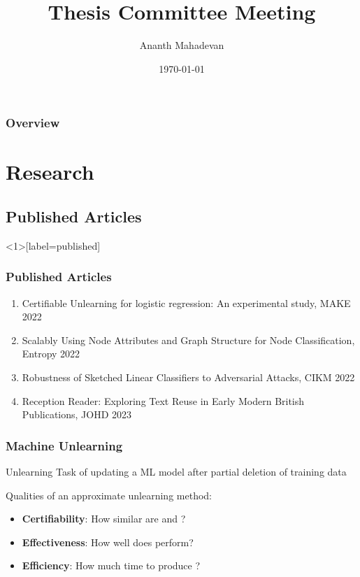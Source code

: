 \documentclass[pdf]{beamer}
\title{Thesis Committee Meeting}
\author[Ananth Mahadevan]{Ananth Mahadevan}
\date{\today}
\begin{document}
\begin{frame}
    \titlepage
\end{frame}

\begin{frame}
    \frametitle{Overview}
    \tableofcontents
\end{frame}

\section{Research}

\subsection{Published Articles}
\begin{frame}<1>[label=published]
    \frametitle{Published Articles}
    \begin{enumerate}[<+->]
        \item Certifiable Unlearning for logistic regression: An experimental study, MAKE 2022 \cite{mahadevan2022certifiable}
        \item Scalably Using Node Attributes and Graph Structure for Node Classification, Entropy 2022 \cite{merchant2022JANE}
        \item Robustness of Sketched Linear Classifiers to Adversarial Attacks, CIKM 2022 \cite{10.1145/3511808.3557687}
        \item Reception Reader: Exploring Text Reuse in Early Modern British Publications, JOHD 2023 \cite{Rosson-2023}
    \end{enumerate}
\end{frame}


\begin{frame}
    \frametitle{Machine Unlearning }
    \scalebox{0.5}{
    \begin{tikzpicture}
        
      \end{tikzpicture}
    }

    \begin{block}{Unlearning}
        Task of updating a ML model after partial deletion of training data
    \end{block}
    Qualities of an approximate unlearning method:
  \begin{itemize}
    \item \textbf{Certifiability}: How similar are \wunlearned and \worig?
    \item \textbf{Effectiveness}: How well does \wunlearned perform?
    \item \textbf{Efficiency}: How much time to produce \wunlearned?
  \end{itemize}

\end{frame}
\end{document}
